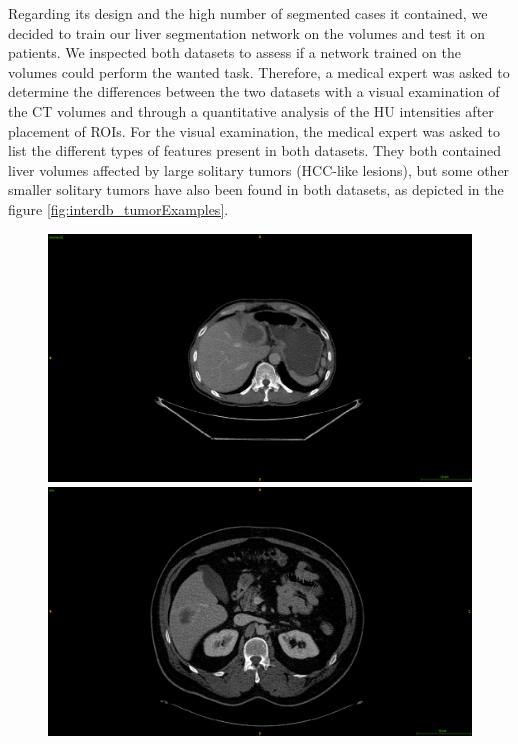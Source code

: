 {
Regarding its design and the high number of segmented cases it contained, we decided to train our liver segmentation network on the \textbf{} volumes and test it on \textbf{} patients.
We inspected both datasets to assess if a network trained on the \textbf{} volumes could perform the wanted task. Therefore, a medical expert was asked to determine the differences between the two datasets with a visual examination of the CT volumes and through a quantitative analysis of the HU intensities after placement of ROIs.
For the visual examination, the medical expert was asked to list the different types of features present in both datasets.
They both contained liver volumes affected by large solitary tumors (HCC-like lesions), but some other smaller solitary tumors have also been found in both datasets, as depicted in the figure \ref{fig:interdb_tumorExamples}. 
\begin{figure}[!ht]
	\begin{mdframed}[backgroundcolor=blue!50,linecolor=blue!50]
		\centering
		\begin{minipage}{0.45\linewidth}
			\includegraphics[width=\linewidth]{images/LITS_examplePatientSmallTumor_2}
		\end{minipage} \hspace{-0.1cm}
		\begin{minipage}{0.45\linewidth}
			\includegraphics[width=\linewidth]{images/TCIA_examplePatientSmallTumor}

\end{minipage}
\end{mdframed}
\end{figure}}
